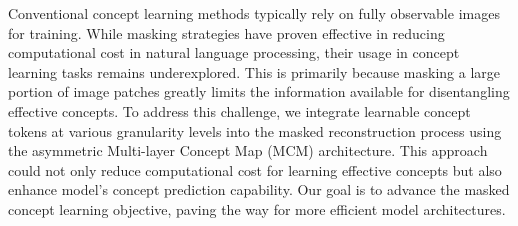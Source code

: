 Conventional concept learning methods typically rely on fully observable images for training. While masking strategies have proven effective in reducing computational cost in natural language processing, their usage in concept learning tasks remains underexplored. This is primarily because masking a large portion of image patches greatly limits the information available for disentangling effective concepts. To address this challenge, we integrate learnable concept tokens at various granularity levels into the masked reconstruction process using the asymmetric Multi-layer Concept Map (MCM) architecture. This approach could not only reduce computational cost for learning effective concepts but also enhance model's concept prediction capability. Our goal is to advance the masked concept learning objective, paving the way for more efficient model architectures.